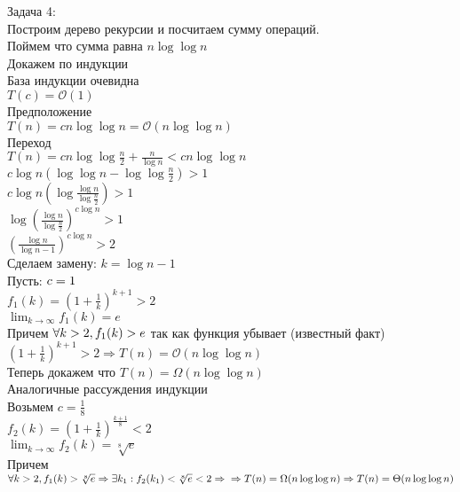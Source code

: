 \documentclass[a4paper, 11pt]{article}
\begin{document}
\quad\quad Задача 4:\\
Построим дерево рекурсии и посчитаем сумму операций.\\
Поймем что сумма равна $n\log{\log{n}}$\\
Докажем по индукции\\
База индукции очевидна\\
$T(c) = \mathcal{O}(1)$\\
Предположение\\
$T(n) = cn\log{\log{n}} = \mathcal{O}(n\log{\log{n}})$\\
Переход\\
$T(n) = cn\log\log{\frac{n}{2}} + \frac{n}{\log{n}} < cn\log\log{n}$\\
$c\log{n}(\log\log{n} - \log\log{\frac{n}{2}}) > 1$\\
$c\log{n}(\log\frac{\log{n}}{\log{\frac{n}{2}}}) > 1$\\
$\log{(\frac{\log{n}}{\log{\frac{n}{2}}})^{c\log{n}}} > 1$\\
$(\frac{\log{n}}{\log{n} - 1})^{c\log{n}} > 2$\\
Сделаем замену: $k = \log{n} - 1$\\
Пусть: $ \space c = 1$\\
$f_1(k) = (1 + \frac{1}{k})^{k + 1} > 2$\\
$\lim_{k \to \infty}f_1(k) = e$\\
Причем $\forall k > 2, \space f_1(k) > e$ так как функция убывает (известный факт)\\
$(1 + \frac{1}{k})^{k + 1} > 2 \Rightarrow
T(n) = \mathcal{O}(n\log{\log{n}})$\\
Теперь докажем что $T(n) = \Omega(n\log{\log{n}})$\\
Аналогичные рассуждения индукции\\
Возьмем $c = \frac{1}{8}$\\
$f_2(k) = (1 + \frac{1}{k})^{\frac{k + 1}{8}} < 2$\\
$\lim_{k \to \infty}f_2(k) = \sqrt[8]{e}$\\
Причем $\forall k > 2, \space f_1(k) > \sqrt[8]{e} \Rightarrow 
\exists k_1 : f_2(k_1) < \sqrt[8]{e} < 2 \Rightarrow\\
\Rightarrow T(n) = \Omega(n\log{\log{n}}) \Rightarrow
T(n) = \Theta(n\log{\log{n}})$\\
\end{document}
